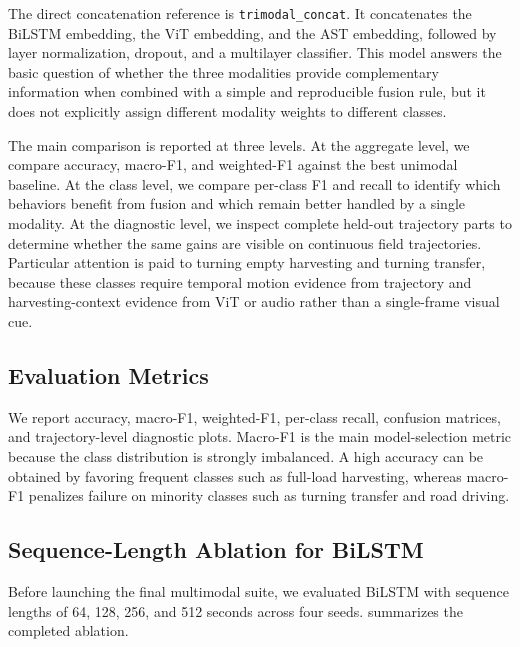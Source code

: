 The direct concatenation reference is \texttt{trimodal\_concat}. It concatenates the BiLSTM embedding, the ViT embedding, and the AST embedding, followed by layer normalization, dropout, and a multilayer classifier. This model answers the basic question of whether the three modalities provide complementary information when combined with a simple and reproducible fusion rule, but it does not explicitly assign different modality weights to different classes.

The main comparison is reported at three levels. At the aggregate level, we compare accuracy, macro-F1, and weighted-F1 against the best unimodal baseline. At the class level, we compare per-class F1 and recall to identify which behaviors benefit from fusion and which remain better handled by a single modality. At the diagnostic level, we inspect complete held-out trajectory parts to determine whether the same gains are visible on continuous field trajectories. Particular attention is paid to turning empty harvesting and turning transfer, because these classes require temporal motion evidence from trajectory and harvesting-context evidence from ViT or audio rather than a single-frame visual cue.

\subsection{Evaluation Metrics}

We report accuracy, macro-F1, weighted-F1, per-class recall, confusion matrices, and trajectory-level diagnostic plots. Macro-F1 is the main model-selection metric because the class distribution is strongly imbalanced. A high accuracy can be obtained by favoring frequent classes such as full-load harvesting, whereas macro-F1 penalizes failure on minority classes such as turning transfer and road driving.

\subsection{Sequence-Length Ablation for BiLSTM}
\label{sec:seq_ablation}

Before launching the final multimodal suite, we evaluated BiLSTM with sequence lengths of 64, 128, 256, and 512 seconds across four seeds.  summarizes the completed ablation.

